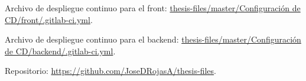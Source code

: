 \newpage
{}\label{appendix:Archivos de configuracion de despliegue continuo}

\noindent Archivo de despliegue continuo para el front: \href{https://raw.githubusercontent.com/JoseDRojasA/thesis-files/master/Configuración de CD/front/.gitlab-ci.yml}{thesis-files/master/Configuraci\'on de CD/front/.gitlab-ci.yml}.

Archivo de despliegue continuo para el backend: \href{https://raw.githubusercontent.com/JoseDRojasA/thesis-files/master/Configuración de CD/backend/.gitlab-ci.yml}{thesis-files/master/Configuraci\'on de CD/backend/.gitlab-ci.yml}.


\noindent Repositorio: \url{https://github.com/JoseDRojasA/thesis-files}.